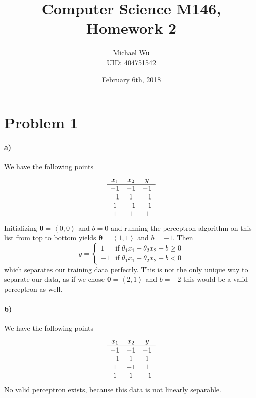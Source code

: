 \documentclass[12pt]{article}
\begin{document}
\title{Computer Science M146, Homework 2}
\date{February 6th, 2018}
\author{Michael Wu\\UID: 404751542}
\maketitle

\section*{Problem 1}

\paragraph{a)}

We have the following points
\[
        \begin{array}{c c c}
                x_1 & x_2 & y\\
                \hline
                -1 & -1 & -1\\
                -1 & 1 & -1\\
                1 & -1 & -1\\
                1 & 1 & 1
        \end{array}
\]
Initializing \(\pmb{\theta}=\left<0,0\right>\) and \(b=0\) and running the perceptron algorithm on this list from top to bottom yields
\(\pmb{\theta}=\left<1,1\right>\) and \(b=-1\). Then
\[y=\begin{cases}
        1 & \text{if } \theta_1x_1+\theta_2x_2+b\geq0\\
        -1 & \text{if } \theta_1x_1+\theta_2x_2+b<0
\end{cases}\]
which separates our training data perfectly. This is not the only unique way to separate our data, as if we chose \(\pmb{\theta}=\left<2,1\right>\)
and \(b=-2\) this would be a valid perceptron as well.

\paragraph{b)}

We have the following points
\[
        \begin{array}{c c c}
                x_1 & x_2 & y\\
                \hline
                -1 & -1 & -1\\
                -1 & 1 & 1\\
                1 & -1 & 1\\
                1 & 1 & -1
        \end{array}
\]
No valid perceptron exists, because this data is not linearly separable.
\end{document}
